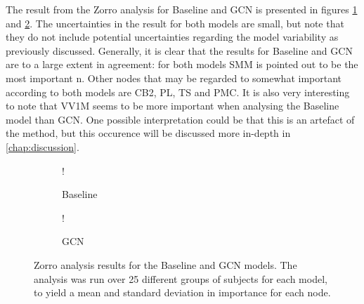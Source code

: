 The result from the Zorro analysis for Baseline and GCN is presented in figures \ref{fig:zorro_sex_baseline} and \ref{fig:zorro_sex_gcn}. The uncertainties in the result for both models are small, but note that they do not include potential uncertainties regarding the model variability as previously discussed. Generally, it is clear that the results for Baseline and GCN are to a large extent in agreement: for both models SMM is pointed out to be the most important n. Other nodes that may be regarded to somewhat important according to both models are CB2, PL, TS and PMC. It is also very interesting to note that VV1M seems to be more important when analysing the Baseline model than GCN. One possible interpretation could be that this is an artefact of the method, but this occurence will be discussed more in-depth in \cref{chap:discussion}.




\begin{figure}[H]
    \centering
        \begin{subfigure}{.5\textwidth}
            \centering
            \begin{center}
                \resizebox {1.0\linewidth} {!} {
                    
                }
            \end{center}
            \caption{Baseline}
            \label{fig:zorro_sex_baseline}
        \end{subfigure}%
        \begin{subfigure}{.5\textwidth}
            \centering
            \begin{center}
                \resizebox {1.0\linewidth} {!} {
                    
                }
            \end{center}
            \caption{GCN}
            \label{fig:zorro_sex_gcn}
        \end{subfigure}
    \caption{Zorro analysis results for the Baseline and GCN models. The analysis was run over 25 different groups of subjects for each model, to yield a mean and standard deviation in importance for each node.}
    \label{fig:zorro_sex}
\end{figure}

